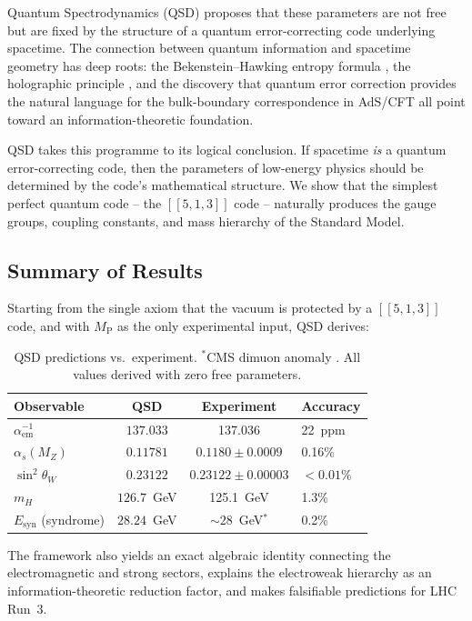 \documentclass[11pt,a4paper]{article}
\theoremstyle{definition}
\newcommand{\Esyn}{E_{\text{syn}}}
\newcommand{\Mpl}{M_{\mathrm{P}}}
\newcommand{\mH}{m_H}
\begin{document}
Quantum Spectrodynamics (QSD) proposes that these parameters are not free but are fixed by the structure of a quantum error-correcting code underlying spacetime. The connection between quantum information and spacetime geometry has deep roots: the Bekenstein--Hawking entropy formula \cite{Bekenstein1973,Hawking1975}, the holographic principle \cite{tHooft1993,Susskind1995}, and the discovery that quantum error correction provides the natural language for the bulk-boundary correspondence in AdS/CFT \cite{Almheiri2015,Pastawski2015} all point toward an information-theoretic foundation.

QSD takes this programme to its logical conclusion. If spacetime \emph{is} a quantum error-correcting code, then the parameters of low-energy physics should be determined by the code's mathematical structure. We show that the simplest perfect quantum code -- the $[[5,1,3]]$ code -- naturally produces the gauge groups, coupling constants, and mass hierarchy of the Standard Model.

\subsection{Summary of Results}

Starting from the single axiom that the vacuum is protected by a $[[5,1,3]]$ code, and with $\Mpl$ as the only experimental input, QSD derives:

\begin{table}[h]
\centering
\begin{tabular}{lccl}
\toprule
\textbf{Observable} & \textbf{QSD} & \textbf{Experiment} & \textbf{Accuracy} \\
\midrule
$\alpha^{-1}_{\text{em}}$ & $\mathbf{137.033}$ & 137.036 & 22~ppm \\
$\alpha_s(M_Z)$ & $\mathbf{0.11781}$ & $0.1180 \pm 0.0009$ & 0.16\% \\
$\sin^2\theta_W$ & $\mathbf{0.23122}$ & $0.23122 \pm 0.00003$ & $< 0.01\%$ \\
$\mH$ & $\mathbf{126.7}$~GeV & 125.1~GeV & 1.3\% \\
$\Esyn$ (syndrome) & $\mathbf{28.24}$~GeV & $\sim 28$~GeV$^*$ & 0.2\% \\
\bottomrule
\end{tabular}
\caption{QSD predictions vs.\ experiment. $^*$CMS dimuon anomaly \cite{CMS2018dimuon}. All values derived with zero free parameters.}
\label{tab:summary}
\end{table}

The framework also yields an exact algebraic identity connecting the electromagnetic and strong sectors, explains the electroweak hierarchy as an information-theoretic reduction factor, and makes falsifiable predictions for LHC Run~3.
\end{document}
